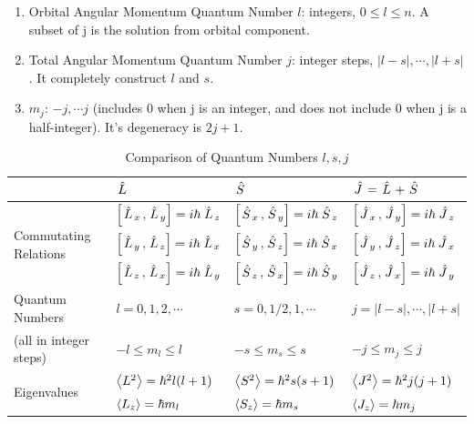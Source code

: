 \documentclass{school-22.101-notes}
\date{October 17, 2011}
\begin{document}
\maketitle

\begin{enumerate}
\item Orbital Angular Momentum Quantum Number $l$: integers, $0 \le l \le n$. A subset of j is the solution from orbital component. 
\item Total Angular Momentum Quantum Number $j$: integer steps, $|l-s|, \cdots, |l+s|$. It completely construct $l$ and $s$. 
\item $m_j$: $-j, \cdots j$ (includes 0 when j is an integer, and does not include 0 when j is a half-integer). It's degeneracy is $2j+1$. 
\end{enumerate}

\begin{table}[h!]
\begin{tabular}{|p{1.5in}|p{1.5in}|p{1.5in}|p{1.5in}|} \hline
 & $\left. \hat{L} \right.$ & $\left. \hat{S} \right.$ &$\left. \hat{J} \right. = \left. \hat{L} \right. + \left. \hat{S} \right.$ \\ \hline
\multirow{3}{*}{Commutating Relations} &
   $\left[ \left. \hat{L} \right._x, \left. \hat{L} \right._y \right] = i \hbar \left. \hat{L} \right._z$ &  $\left[ \left. \hat{S} \right._x, \left. \hat{S} \right._y \right] = i \hbar \left. \hat{S} \right._z$ &  $\left[ \left. \hat{J} \right._x, \left. \hat{J} \right._y \right] = i \hbar \left. \hat{J} \right._z$ \\
&  $\left[ \left. \hat{L} \right._y, \left. \hat{L} \right._z \right] = i \hbar \left. \hat{L} \right._x$ &  $\left[ \left. \hat{S} \right._y, \left. \hat{S} \right._z \right] = i \hbar \left. \hat{S} \right._x$ &  $\left[ \left. \hat{J} \right._y, \left. \hat{J} \right._z \right] = i \hbar \left. \hat{J} \right._x$ \\
&  $\left[ \left. \hat{L} \right._z, \left. \hat{L} \right._x \right] = i \hbar \left. \hat{L} \right._y$ &  $\left[ \left. \hat{S} \right._z, \left. \hat{S} \right._x \right] = i \hbar \left. \hat{S} \right._y$ &  $\left[ \left. \hat{J} \right._z, \left. \hat{J} \right._x \right] = i \hbar \left. \hat{J} \right._y$ \\ \hline
Quantum Numbers & $ l = 0,1,2,\cdots $ & $s = 0, 1/2, 1, \cdots$               & $ j =|l-s|,\cdots, |l+s|$ \\
(all in integer steps) & $-l \le m_l \le l  $  & $ -s \le m_s \le s$  & $-j \le m_j \le j$  \\ \hline
\multirow{2}{*}{Eigenvalues} 
& $\left< L^2 \right> = \hbar^2 l (l+1)$ 
& $\left< S^2 \right> = \hbar^2 s (s+1)$
& $\left< J^2 \right> = \hbar^2 j(j+1)$\\ 
& $\left< L_z \right> = \hbar m_l$ 
& $\left< S_z \right> = \hbar m_s$ 
& $\left< J_z \right> =  \hbar m_j$  \\ \hline
\end{tabular}
\caption{Comparison of Quantum Numbers $l,s,j$}
\label{quantum-numbers}
\end{table}
\end{document}
